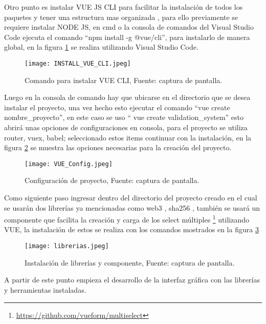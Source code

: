 Otro punto es instalar  VUE JS CLI para facilitar la instalación de todos los paquetes y tener una estructura mas organizada \cite[]{vue_cli_overview_2019},
para ello previamente se requiere instalar  NODE JS, en cmd o la consola de comandos del Visual 
Studio Code ejecuta el comando “npm install -g @vue/cli”, para instalarlo de manera global,
en la figura \ref{img:INSTALL_VUE_CLI} se realiza utilizando Visual Studio Code.

\begin{figure}[hbt!]
  \centering
  {\texttt{[image: INSTALL\_VUE\_CLI.jpeg]}}
  \caption{Comando para instalar VUE CLI, Fuente: captura de pantalla. }
  \label{img:INSTALL_VUE_CLI}
\end{figure}

Luego en la consola de comando hay que ubicarse en el directorio que se desea instalar el proyecto, una vez hecho esto ejecutar el comando 
“vue create nombre\_proyecto”, en este caso se uso “ vue create validation\_system” esto abrirá unas opciones de configuraciones en consola, 
para el proyecto se utiliza router, vuex, babel; seleccionado estos items continuar con la instalación, en la figura \ref{img:vue_config} se muestra
las opciones necesarias para la creación del proyecto.

\begin{figure}[hbt!]
  \centering
  {\texttt{[image: VUE\_Config.jpeg]}}
  \caption{Configuración de proyecto, Fuente: captura de pantalla. }
  \label{img:vue_config}
\end{figure}

Como siguiente paso ingresar dentro del directorio del proyecto creado en el cual se usarán dos librerías ya mencionadas como web3 \cite[]{web3js_web3js_2016}, sha256 \cite[]{satoh_asic-hardware-focused_2007}, también se usará un componente
que facilita la creación y carga de los select múltiples \footnote{\url{https://github.com/vueform/multiselect}} utilizando VUE, la instalación de estos se realiza con los comandos mostrados en la figura \ref{img:libreria}

\begin{figure}[hbt!]
  \centering
  {\texttt{[image: librerias.jpeg]}}
  \caption{Instalación de librerías y componente, Fuente: captura de pantalla. }
  \label{img:libreria}
\end{figure}

A partir de este punto empieza el desarrollo de la interfaz gráfica con las librerías y herramientas instaladas.

